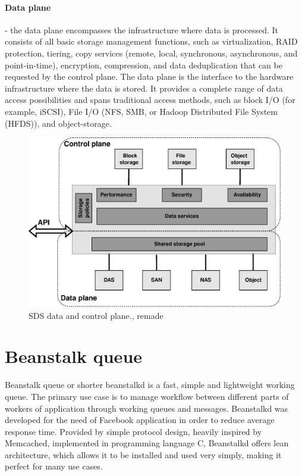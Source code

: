     \paragraph{Data plane}
    - the data plane encompasses the infrastructure where data is processed. It consists of all basic storage management functions, such as virtualization, RAID protection, tiering, copy services (remote, local, synchronous, asynchronous, and point-in-time), encryption, compression, and data deduplication that can be requested by the control plane. The data plane is the interface to the hardware infrastructure where the data is stored. It provides a complete range of data access possibilities and spans traditional access methods, such as block I/O (for example, iSCSI), File I/O (NFS, SMB, or Hadoop Distributed File System (HFDS)), and object-storage\cite{sdsIBMSDSGuide}.

    \begin{figure}[hbt]
        \centering
        \includegraphics[width=1\textwidth]{obrazky-figures/sds-planes.eps}
        \caption{SDS data and control plane.\cite{sdsPlanes}, remade}
        \label{fig:beanstalkdJobSM}
    \end{figure}

\section{Beanstalk queue}

    Beanstalk queue or shorter beanstalkd is a fast, simple and lightweight working queue\cite{beanstalkdOfficial}. The primary use case is to manage workflow between different parts of workers of application through working queues and messages. Beanstalkd was developed for the need of Facebook application in order to reduce average response time\cite{beanstalkdOfficial}. Provided by simple protocol design, heavily inspired by Memcached, implemented in programming language C, Beanstalkd offers lean architecture, which allows it to be installed and used very simply, making it perfect for many use cases\cite{beanstalkdInstall}.


